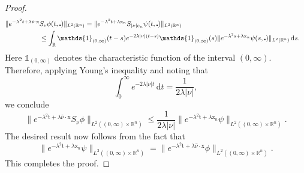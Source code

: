 \documentclass[10pt,a4paper]{amsart}
\theoremstyle{remark}
\theoremstyle{definition}
\newcommand{\R}{\mathbb{R}}
\newcommand{\dd}{\mathrm{d}}
\newcommand{\tm}{\mathrm{t}}
\newcommand{\x}{\mathrm{x}}
\begin{document}
\begin{proof}
\begin{align*}
   \| e^{-\lambda^2 t + \lambda \hat{\nu} \cdot \x} & S_\nu \phi (t, \centerdot) \|_{L^2(\R^n)} = \|e^{-\lambda^2 t + \lambda \x_n} S_{|\nu| e_n} \psi(t, \centerdot)\|_{L^2(\R^{n})}\cr
        &\leq \int_\R \mathds{1}_{(0, \infty)}(t-s) e^{-2\lambda |\nu| (t-s)} \mathds{1}_{(0, \infty)}(s)\|e^{-\lambda^2 s + \lambda \x_n}\psi(s, \centerdot)\|_{L^2(\R^{n})}   \, \dd s.
\end{align*}
Here $\mathds{1}_{(0, \infty)}$ denotes the characteristic function of the interval
$(0, \infty)$.
Therefore, applying Young's inequality and noting that 
\[ \int_0^\infty e^{-2\lambda |\nu| t} \, \dd t = \frac{1}{2\lambda  |\nu|}, \]
we conclude
\begin{equation*}
    \| e^{-\lambda^2 \tm + \lambda \hat{\nu} \cdot \x} S_\nu \phi \|_{L^2((0, \infty) \times \R^n)}  \leq \frac{1}{2 \lambda |\nu|} \| e^{-\lambda^2 \tm + \lambda \x_n} \psi \|_{L^2((0, \infty) \times \R^n)}.
\end{equation*}
The desired result now follows from the fact that 
\begin{equation*}
   \| e^{-\lambda^2 \tm + \lambda \x_n} \psi \|_{L^2((0, \infty) \times \R^n)} =  \| e^{-\lambda^2 \tm + \lambda \hat{\nu} \cdot \x}  \phi \|_{L^2((0, \infty) \times \R^n)}.
\end{equation*}
This completes the proof.
\end{proof}
\end{document}
